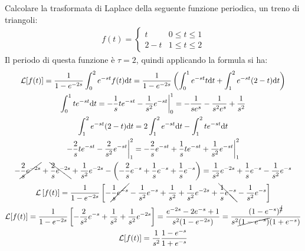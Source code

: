 \documentclass{article}
\newcommand{\df}{\mathrm{d}}
\numberwithin{equation}{subsection}
\begin{document}
Calcolare la trasformata di Laplace della seguente funzione periodica, un treno di triangoli:
\begin{gather*}
    f(t)=\begin{cases}
        t&0\leq t\leq1\\
        2-t&1\leq t\leq2
    \end{cases}
\end{gather*}
Il periodo di questa funzione è $\tau=2$, quindi applicando la formula si ha:
\begin{gather*}
    \mathcal{L}[f(t)]=\frac{1}{1-e^{-2s}}\int_0^2e^{-st}f(t)\df t=\frac{1}{1-e^{-2s}}\left(\int_0^1e^{-st}t\df t+\int_1^2e^{-st}(2-t)\df t\right)\\
    \int_0^1te^{-st}\df t=-\frac{1}{s}te^{-st}-\frac{1}{s^2}e^{-st}\bigg|_0^1=-\frac{1}{se^{s}}-\frac{1}{s^2e^s}+\frac{1}{s^2}\\
    \int_1^2e^{-st}(2-t)\df t=2\int_1^2e^{-st}\df t-\int_1^2te^{-st}\df t\\
    -\frac{2}{s}te^{-st}-\frac{2}{s^2}e^{-st}\bigg|_1^2=-\frac{2}{s}e^{-st}+\frac{1}{s}te^{-st}+\frac{1}{s^2}e^{-st}\bigg|_1^2\\
    -\cancel{\frac{2}{s}e^{-2s}}+\bcancel{\frac{2}{s}e^{-2s}}+\frac{1}{s^2}e^{-2s}-\left(-\frac{2}{s}e^{-s}+\frac{1}{s}e^{-s}+\frac{1}{s}e^{-s}\right)=\frac{1}{s^2}e^{-2s}+\frac{1}{s}e^{-s}-\frac{1}{s^2}e^{-s}\\
    \mathcal{L}\left[f(t)\right]=
    \frac{1}{1-e^{-2s}}\left[-\cancel{\frac{1}{s}e^{-s}}-\frac{1}{s^2}e^{-s}+\frac{1}{s^2}+\frac{1}{s^2}e^{-2s}+\bcancel{\frac{1}{s}e^{-s}}-\frac{1}{s^2}e^{-s}\right]\\
    \mathcal{L}[f(t)]=
    \frac{1}{1-e^{-2s}}\left[-\frac{2}{s^2}e^{-s}+\frac{1}{s^2}+\frac{1}{s^2}e^{-2s}\right]=
    \frac{e^{-2s}-2e^{-s}+1}{s^2(1-e^{-2s})}=
    \frac{(1-e^{-s})^{\cancel{2}}}{s^2\cancel{(1-e^{-s})}(1+e^{-s})}\\
    \mathcal{L}[f(t)]=\frac{1}{s^2}\frac{1-e^{-s}}{1+e^{-s}}
\end{gather*}
\end{document}
